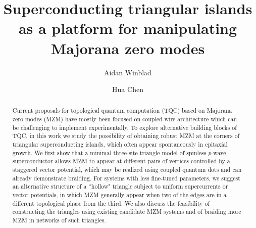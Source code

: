 \documentclass[aps,prb,twocolumn,showpacs,amsmath,amssymb,superscriptaddress]{revtex4-2}
\begin{document}
\title{Superconducting triangular islands as a platform for manipulating Majorana zero modes}

\author{Aidan Winblad}

\author{Hua Chen}

\begin{abstract}
Current proposals for topological quantum computation (TQC) based on Majorana zero modes (MZM) have mostly been focused on coupled-wire architecture which can be challenging to implement experimentally. To explore alternative building blocks of TQC, in this work we study the possibility of obtaining robust MZM at the corners of triangular superconducting islands, which often appear spontaneously in epitaxial growth. We first show that a minimal three-site triangle model of spinless $p$-wave superconductor allows MZM to appear at different pairs of vertices controlled by a staggered vector potential, which may be realized using coupled quantum dots and can already demonstrate braiding. For systems with less fine-tuned parameters, we suggest an alternative structure of a ``hollow" triangle subject to uniform supercurrents or vector potentials, in which MZM generally appear when two of the edges are in a different topological phase from the third. We also discuss the feasibility of constructing the triangles using existing candidate MZM systems and of braiding more MZM in networks of such triangles.
\end{abstract}


\maketitle
\end{document}
